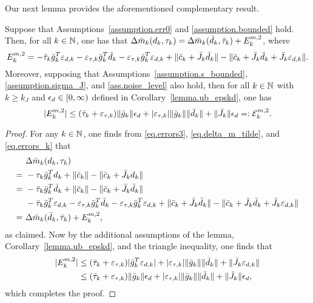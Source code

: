 Our next lemma provides the aforementioned complementary result.

\begin{lemma}\label{lemma.m2}
  Suppose that Assumptions~\ref{assumption.err0} and \ref{assumption.bounded} hold.  Then, for all $k \in \mathbb{N}$, one has that $\Delta {\bar m}_k (d_k, \tau_k) = \Delta {\bar m}_k ({\bar d}_k, {\bar \tau}_k) + E_k^{m, 2}$, where
  \begin{equation*}
    E_k^{m, 2} = - {\bar \tau}_k {\bar g}_k^T \varepsilon_{d,k} - \varepsilon_{\tau,k} {\bar g}_k^T {\bar d}_k - \varepsilon_{\tau,k} {\bar g}_k^T \varepsilon_{d,k} + \|{\bar c}_k + {\bar J}_k {\bar d}_k\| - \|{\bar c}_k + {\bar J}_k {\bar d}_k + {\bar J}_k \varepsilon_{d,k}\|.
  \end{equation*}
  Moreover, supposing that Assumptions~\ref{assumption.s_bounded}, \ref{assumption.sigma_J}, and \ref{ass.noise_level} also hold, then for all $k \in \mathbb{N}$ with $k \geq k_J$ and $\epsilon_d \in [0,\infty)$ defined in Corollary~\ref{lemma.ub_epskd}, one has
  \begin{equation*}
    |E_k^{m, 2}| \leq ({\bar \tau}_k + \varepsilon_{\tau,k}) \|{\bar g}_k\| \epsilon_d + |\varepsilon_{\tau,k}| \|{\bar g}_k\| \|{\bar d}_k\| + \| {\bar J}_k\| \epsilon_d =: \mathcal{E}_k^{m, 2}.
  \end{equation*}
\end{lemma}
\begin{proof}
  For any $k \in \mathbb{N}$, one finds from \eqref{eq.errors3}, \eqref{eq.delta_m_tilde}, and \eqref{eq.errors_k} that
  \begin{align*}
    &\ \Delta {\bar m}_k(d_k, \tau_k) \\
    =&\ - \tau_k {\bar g}_k^T d_k + \|{\bar c}_k\| - \|{\bar c}_k + {\bar J}_k d_k\| \\
    =&\ - {\bar \tau}_k {\bar g}_k^T {\bar d}_k + \|{\bar c}_k\| -  \|{\bar c}_k + {\bar J}_k {\bar d}_k \| \\
     &\ - {\bar \tau}_k {\bar g}_k^T \varepsilon_{d,k} - \varepsilon_{\tau,k} {\bar g}_k^T {\bar d}_k - \varepsilon_{\tau,k} {\bar g}_k^T \varepsilon_{d,k} + \|{\bar c}_k + {\bar J}_k {\bar d}_k\| - \|{\bar c}_k + {\bar J}_k {\bar d}_k + {\bar J}_k \varepsilon_{d,k}\| \\
    =&\ \Delta {\bar m}_k({\bar d}_k, {\bar \tau}_k) + E_k^{m, 2},
  \end{align*}
  as claimed.  Now by the additional assumptions of the lemma, Corollary~\ref{lemma.ub_epskd}, and the triangle inequality, one finds that
  \begin{align*}
    |E_k^{m, 2}| 
    &\leq ({\bar \tau}_k + \varepsilon_{\tau,k}) |{\bar g}_k^T \varepsilon_{d,k} | + |\varepsilon_{\tau,k}| \|{\bar g}_k\| \|{\bar d}_k\| + \| {\bar J}_k \varepsilon_{d,k}\| \\
    &\leq ({\bar \tau}_k + \varepsilon_{\tau,k}) \|{\bar g}_k\| \epsilon_d + |\varepsilon_{\tau,k}| \|{\bar g}_k\| \|{\bar d}_k\| + \| {\bar J}_k\| \epsilon_d,
  \end{align*}
  which completes the proof.
\end{proof}

